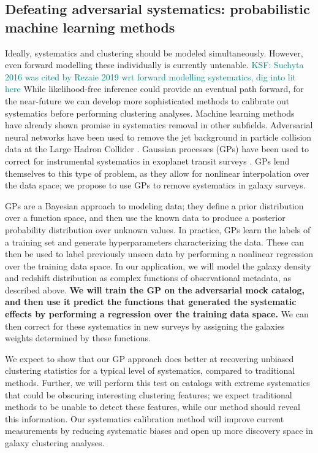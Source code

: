 \documentclass[12pt, fullpage, letterpaper]{article}
\newcommand{\KSF}[1]{\textcolor{teal}{KSF: #1}}
\begin{document}
\subsection{Defeating adversarial systematics: probabilistic machine learning methods}

Ideally, systematics and clustering should be modeled simultaneously. 
However, even forward modelling these individually is currently untenable. \KSF{Suchyta 2016 was cited by Rezaie 2019 wrt forward modelling systematics, dig into lit here} 
While likelihood-free inference could provide an eventual path forward, for the near-future we can develop more sophisticated methods to calibrate out systematics before performing clustering analyses.
Machine learning methods have already shown promise in systematics removal in other subfields.
Adversarial neural networks have been used to remove the jet background in particle collision data at the Large Hadron Collider \citep{Shimmin2017}.
Gaussian processes (GPs) have been used to correct for instrumental systematics in exoplanet transit surveys \citep{Gibson2012, Aigrain2016}. 
GPs lend themselves to this type of problem, as they allow for nonlinear interpolation over the data space; we propose to use GPs to remove systematics in galaxy surveys.

GPs are a Bayesian approach to modeling data; they define a prior distribution over a function space, and then use the known data to produce a posterior probability distribution over unknown values. 
In practice, GPs learn the labels of a training set and generate hyperparameters characterizing the data.
These can then be used to label previously unseen data by performing a nonlinear regression over the training data space.
In our application, we will model the galaxy density and redshift distribution as complex functions of observational metadata, as described above.
\textbf{We will train the GP on the adversarial mock catalog, and then use it predict the functions that generated the systematic effects by performing a regression over the training data space.}
We can then correct for these systematics in new surveys by assigning the galaxies weights determined by these functions.

We expect to show that our GP approach does better at recovering unbiased clustering statistics for a typical level of systematics, compared to traditional methods.
Further, we will perform this test on catalogs with extreme systematics that could be obscuring interesting clustering features; we expect traditional methods to be unable to detect these features, while our method should reveal this information.
Our systematics calibration method will improve current measurements by reducing systematic biases and open up more discovery space in galaxy clustering analyses.
\end{document}
